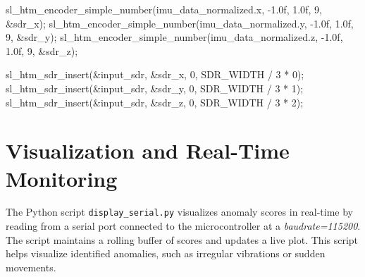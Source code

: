 \documentclass[
  9pt,
  letterpaper,
  abstract,
  titlepage]{scrbook}
\newenvironment{Shaded}{\begin{snugshade}}{\end{snugshade}}
\newcommand{\BuiltInTok}[1]{\textcolor[rgb]{0.00,0.23,0.31}{#1}}
\newcommand{\DecValTok}[1]{\textcolor[rgb]{0.68,0.00,0.00}{#1}}
\newcommand{\FloatTok}[1]{\textcolor[rgb]{0.68,0.00,0.00}{#1}}
\newcommand{\NormalTok}[1]{\textcolor[rgb]{0.00,0.23,0.31}{#1}}
\newcommand{\OperatorTok}[1]{\textcolor[rgb]{0.37,0.37,0.37}{#1}}
\begin{document}
\begin{Shaded}
\begin{Highlighting}[]
\NormalTok{sl\_htm\_encoder\_simple\_number}\OperatorTok{(}\NormalTok{imu\_data\_normalized}\OperatorTok{.}\NormalTok{x}\OperatorTok{,} \OperatorTok{{-}}\FloatTok{1.0}\BuiltInTok{f}\OperatorTok{,} \FloatTok{1.0}\BuiltInTok{f}\OperatorTok{,} \DecValTok{9}\OperatorTok{,} \OperatorTok{\&}\NormalTok{sdr\_x}\OperatorTok{);}
\NormalTok{sl\_htm\_encoder\_simple\_number}\OperatorTok{(}\NormalTok{imu\_data\_normalized}\OperatorTok{.}\NormalTok{y}\OperatorTok{,} \OperatorTok{{-}}\FloatTok{1.0}\BuiltInTok{f}\OperatorTok{,} \FloatTok{1.0}\BuiltInTok{f}\OperatorTok{,} \DecValTok{9}\OperatorTok{,} \OperatorTok{\&}\NormalTok{sdr\_y}\OperatorTok{);}
\NormalTok{sl\_htm\_encoder\_simple\_number}\OperatorTok{(}\NormalTok{imu\_data\_normalized}\OperatorTok{.}\NormalTok{z}\OperatorTok{,} \OperatorTok{{-}}\FloatTok{1.0}\BuiltInTok{f}\OperatorTok{,} \FloatTok{1.0}\BuiltInTok{f}\OperatorTok{,} \DecValTok{9}\OperatorTok{,} \OperatorTok{\&}\NormalTok{sdr\_z}\OperatorTok{);}

\NormalTok{sl\_htm\_sdr\_insert}\OperatorTok{(\&}\NormalTok{input\_sdr}\OperatorTok{,} \OperatorTok{\&}\NormalTok{sdr\_x}\OperatorTok{,} \DecValTok{0}\OperatorTok{,}\NormalTok{ SDR\_WIDTH }\OperatorTok{/} \DecValTok{3} \OperatorTok{*} \DecValTok{0}\OperatorTok{);}
\NormalTok{sl\_htm\_sdr\_insert}\OperatorTok{(\&}\NormalTok{input\_sdr}\OperatorTok{,} \OperatorTok{\&}\NormalTok{sdr\_y}\OperatorTok{,} \DecValTok{0}\OperatorTok{,}\NormalTok{ SDR\_WIDTH }\OperatorTok{/} \DecValTok{3} \OperatorTok{*} \DecValTok{1}\OperatorTok{);}
\NormalTok{sl\_htm\_sdr\_insert}\OperatorTok{(\&}\NormalTok{input\_sdr}\OperatorTok{,} \OperatorTok{\&}\NormalTok{sdr\_z}\OperatorTok{,} \DecValTok{0}\OperatorTok{,}\NormalTok{ SDR\_WIDTH }\OperatorTok{/} \DecValTok{3} \OperatorTok{*} \DecValTok{2}\OperatorTok{);}
\end{Highlighting}
\end{Shaded}

\section{Visualization and Real-Time
Monitoring}\label{visualization-and-real-time-monitoring}

The Python script \texttt{display\_serial.py} visualizes anomaly scores
in real-time by reading from a serial port connected to the
microcontroller at a \emph{baudrate=115200}. The script maintains a
rolling buffer of scores and updates a live plot. This script helps
visualize identified anomalies, such as irregular vibrations or sudden
movements.
\end{document}
